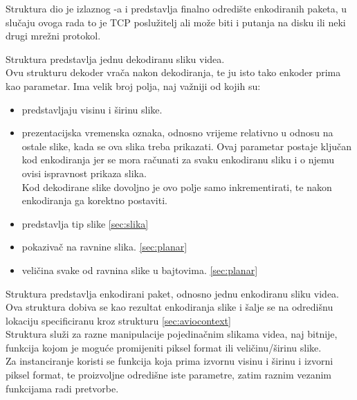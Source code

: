  \label{sec:aviocontext}
Struktura  dio je izlaznog -a i predstavlja finalno odredište enkodiranih
paketa, u slučaju ovoga rada to je TCP poslužitelj ali može biti i putanja na disku ili neki drugi mrežni protokol.

 \label{sec:av_frame}
Struktura  predstavlja jednu dekodiranu sliku videa. 
\\
Ovu strukturu dekoder vrača nakon dekodiranja, te ju isto tako enkoder prima kao parametar. \cite{ffmpegDocs}
\paraBreak
Ima velik broj polja, naj važniji od kojih su:
\begin{itemize}
  \item {} predstavljaju visinu i širinu slike.
  \item {} prezentacijska vremenska oznaka, odnosno vrijeme relativno u odnosu na ostale slike, kada se ova
  slika treba prikazati. Ovaj parametar postaje ključan kod enkodiranja jer se mora računati za svaku enkodiranu sliku i o njemu
  ovisi ispravnost prikaza slika. \cite{ffmpegDocs} \\
  Kod dekodirane slike dovoljno je ovo polje samo inkrementirati, te nakon enkodiranja ga korektno postaviti.
  \item {} predstavlja tip slike \ref{sec:slika}
  \item {} pokazivač na ravnine slika. \ref{sec:planar}
  \item {} veličina svake od ravnina slike u bajtovima. \ref{sec:planar}
\end{itemize}

 \label{sec:av_packet}
Struktura  predstavlja enkodirani paket, odnosno jednu enkodiranu sliku videa. \\
Ova struktura dobiva se kao rezultat enkodiranja slike i šalje se na odredišnu lokaciju specificiranu kroz 
 strukturu \ref{sec:aviocontext} \\

 \label{sec:sws_context}
Struktura  služi za razne manipulacije pojedinačnim slikama videa, naj bitnije, funkcija
 kojom je moguće promijeniti piksel format ili veličinu/širinu slike. \\
Za instanciranje koristi se funkcija  koja prima izvornu visinu i širinu i izvorni
piksel format, te proizvoljne odredišne iste parametre, zatim raznim vezanim funkcijama radi pretvorbe.

